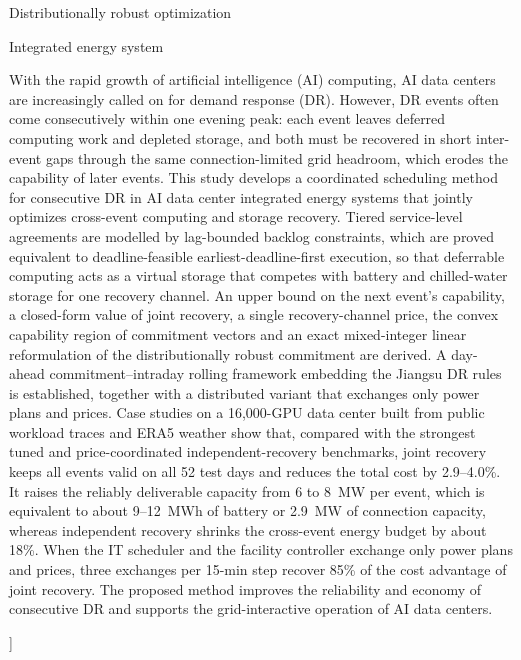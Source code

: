 \documentclass[9pt,twocolumn]{extarticle}
\newcommand{\PaperEmail}{[e-mail address]}
\begin{document}
{\begin{minipage}[t]{0.245\textwidth}
{Distributionally robust optimization\par
Integrated energy system\par}
\end{minipage}\hfill
\begin{minipage}[t]{0.725\textwidth}
\par\vspace{1.6mm}\aethinrule\vspace{1.2mm}
{\fontsize{7.6}{9.75}\selectfont\justifying
With the rapid growth of artificial intelligence (AI) computing, AI data centers are increasingly called on for demand
response (DR). However, DR events often come consecutively within one evening peak: each event leaves deferred computing
work and depleted storage, and both must be recovered in short inter-event gaps through the same connection-limited grid
headroom, which erodes the capability of later events. This study develops a coordinated scheduling method for
consecutive DR in AI data center integrated energy systems that jointly optimizes cross-event computing and storage
recovery. Tiered service-level agreements are modelled by lag-bounded backlog constraints, which are proved equivalent to
deadline-feasible earliest-deadline-first execution, so that deferrable computing acts as a virtual storage that competes
with battery and chilled-water storage for one recovery channel. An upper bound on the next event's capability, a
closed-form value of joint recovery, a single recovery-channel price, the convex capability region of commitment vectors
and an exact mixed-integer linear reformulation of the distributionally robust commitment are derived. A day-ahead
commitment--intraday rolling framework embedding the Jiangsu DR rules is established, together with a distributed variant
that exchanges only power plans and prices. Case studies on a 16,000-GPU data center built from public workload traces
and ERA5 weather show that, compared with the strongest tuned and price-coordinated independent-recovery benchmarks,
joint recovery keeps all events valid on all 52 test days and reduces the total cost by 2.9--4.0\%. It raises the
reliably deliverable capacity from 6 to 8~MW per event, which is equivalent to about 9--12~MWh of battery or 2.9~MW of
connection capacity, whereas independent recovery shrinks the cross-event energy budget by about 18\%. When the IT
scheduler and the facility controller exchange only power plans and prices, three exchanges per 15-min step recover 85\%
of the cost advantage of joint recovery. The proposed method improves the reliability and economy of consecutive DR and
supports the grid-interactive operation of AI data centers.\par}
\vspace{1.4mm}\aethinrule
\end{minipage}
\vspace{6mm}
}]
{\renewcommand{\thefootnote}{\fnsymbol{footnote}}\footnotetext[1]{Corresponding author.\ \textit{E-mail address:} \PaperEmail.}}
\end{document}
